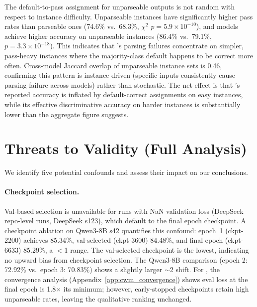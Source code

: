 The default-to-pass assignment for unparseable \cwm{} outputs is not random with respect to instance difficulty. Unparseable instances have significantly higher pass rates than parseable ones (74.6\% vs.\ 68.3\%, $\chi^2$ $p = 5.9 \times 10^{-10}$), and \cls{} models achieve higher accuracy on unparseable instances (86.4\% vs.\ 79.1\%, $p = 3.3 \times 10^{-18}$). This indicates that \cwm{}'s parsing failures concentrate on simpler, pass-heavy instances where the majority-class default happens to be correct more often. Cross-model Jaccard overlap of unparseable instance sets is 0.46, confirming this pattern is instance-driven (specific inputs consistently cause parsing failure across models) rather than stochastic. The net effect is that \cwm{}'s reported accuracy is inflated by default-correct assignments on easy instances, while its effective discriminative accuracy on harder instances is substantially lower than the aggregate figure suggests.


\section{Threats to Validity (Full Analysis)}
\label{app:threats}

We identify five potential confounds and assess their impact on our conclusions.

\paragraph{Checkpoint selection.} Val-based selection is unavailable for runs with NaN validation loss (DeepSeek \cwm{} repo-level runs, DeepSeek \cls{} s123), which default to the final epoch checkpoint. A checkpoint ablation on Qwen3-8B \cls{} s42 quantifies this confound: epoch~1 (ckpt-2200) achieves 85.34\%, val-selected (ckpt-3600) 84.48\%, and final epoch (ckpt-6633) 85.29\%, a $<$1\pp{} range. The val-selected checkpoint is the lowest, indicating no upward bias from checkpoint selection. The Qwen3-8B \traj{} comparison (epoch 2: 72.92\% vs.\ epoch 3: 70.83\%) shows a slightly larger ${\sim}$2\pp{} shift. For \cwm{}, the convergence analysis (Appendix~\ref{app:cwm_convergence}) shows eval loss at the final epoch is 1.8$\times$ its minimum; however, early-stopped checkpoints retain high unparseable rates, leaving the qualitative ranking unchanged.

